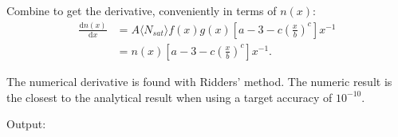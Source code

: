 Combine to get the derivative, conveniently in terms of $n(x)$:
\begin{equation}
\begin{split}
\frac{\mathrm{d}n(x)}{\mathrm{d}x} & = 
A \langle N_{sat} \rangle
f(x) g(x)
\left[ a-3 - c \left(\frac{x}{b}\right)^c  \right] x^{-1} \\
& = n(x)
\left[ a-3 - c \left(\frac{x}{b}\right)^c  \right] x^{-1}.
\end{split}
\end{equation}

The numerical derivative is found with Ridders' method. The numeric result is the closest to the analytical result when using a target accuracy of $10^{-10}$.



Output:



